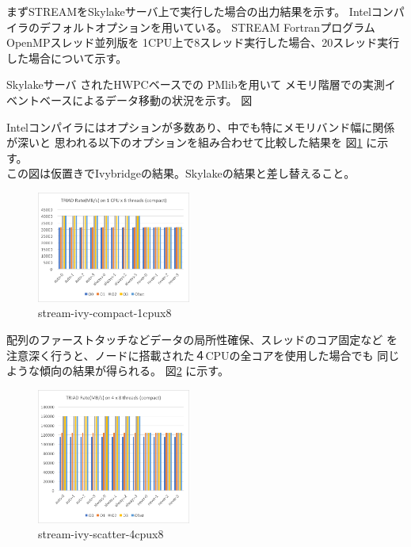 \documentclass[submit,techrep,noauthor]{ipsj}
\begin{document}
まずSTREAMをSkylakeサーバ上で実行した場合の出力結果を示す。
Intelコンパイラのデフォルトオプションを用いている。
STREAM FortranプログラムOpenMPスレッド並列版を
1CPU上で8スレッド実行した場合、20スレッド実行した場合について示す。


Skylakeサーバ
されたHWPCベースでの
PMlibを用いて
メモリ階層での実測イベントベースによるデータ移動の状況を示す。
図



Intelコンパイラにはオプションが多数あり、中でも特にメモリバンド幅に関係が深いと
思われる以下のオプションを組み合わせて比較した結果を
図\ref{fig:stream-ivy-compact-1cpux8} に示す。\\
{\color{blue}この図は仮置きでIvybridgeの結果。Skylakeの結果と差し替えること。}

\begin{figure}[tb]
\centering\includegraphics[width=0.45\textwidth]{figs/stream-ivy-compact-1cpux8.png}
\caption{stream-ivy-compact-1cpux8}
\label{fig:stream-ivy-compact-1cpux8}
\end{figure}


配列のファーストタッチなどデータの局所性確保、スレッドのコア固定など
を注意深く行うと、ノードに搭載された４CPUの全コアを使用した場合でも
同じような傾向の結果が得られる。
図\ref{fig:stream-ivy-scatter-4cpux8} に示す。\\

\begin{figure}[tb]
\centering\includegraphics[width=0.45\textwidth]{figs/stream-ivy-scatter-4cpux8.png}
\caption{stream-ivy-scatter-4cpux8}
\label{fig:stream-ivy-scatter-4cpux8}
\end{figure}
\end{document}
